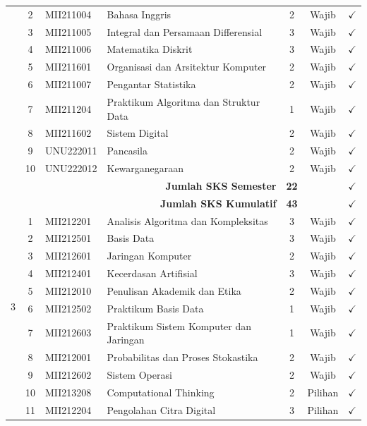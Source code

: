 \begin{longtable}{|c|c|l|p{5.5cm}|c|c|c|}
    & 2 & MII211004 & Bahasa Inggris & 2 & Wajib & $\checkmark$ \\
    & 3 & MII211005 & Integral dan Persamaan Differensial & 3 & Wajib & $\checkmark$ \\
    & 4 & MII211006 & Matematika Diskrit & 3 & Wajib & $\checkmark$ \\
    & 5 & MII211601 & Organisasi dan Arsitektur Komputer & 2 & Wajib & $\checkmark$ \\
    & 6 & MII211007 & Pengantar Statistika & 2 & Wajib & $\checkmark$ \\
    & 7 & MII211204 & Praktikum Algoritma dan Struktur Data & 1 & Wajib & $\checkmark$ \\
    & 8 & MII211602 & Sistem Digital & 2 & Wajib & $\checkmark$ \\
    & 9 & UNU222011 & Pancasila & 2 & Wajib & $\checkmark$ \\
    & 10 & UNU222012 & Kewarganegaraan & 2 & Wajib & $\checkmark$ \\
    \hline
    \multicolumn{4}{|r|}{\textbf{Jumlah SKS Semester}} & \textbf{22} & & $\checkmark$ \\
    \multicolumn{4}{|r|}{\textbf{Jumlah SKS Kumulatif}} & \textbf{43} & & $\checkmark$ \\
    \hline
    \multirow{10}{*}{3}
    & 1 & MII212201 & Analisis Algoritma dan Kompleksitas & 3 & Wajib & $\checkmark$ \\
    & 2 & MII212501 & Basis Data & 3 & Wajib & $\checkmark$ \\
    & 3 & MII212601 & Jaringan Komputer & 2 & Wajib & $\checkmark$ \\
    & 4 & MII212401 & Kecerdasan Artifisial & 3 & Wajib & $\checkmark$ \\
    & 5 & MII212010 & Penulisan Akademik dan Etika & 2 & Wajib & $\checkmark$ \\
    & 6 & MII212502 & Praktikum Basis Data & 1 & Wajib & $\checkmark$ \\
    & 7 & MII212603 & Praktikum Sistem Komputer dan Jaringan & 1 & Wajib & $\checkmark$ \\
    & 8 & MII212001 & Probabilitas dan Proses Stokastika & 2 & Wajib & $\checkmark$ \\
    & 9 & MII212602 & Sistem Operasi & 2 & Wajib & $\checkmark$ \\
    & 10 & MII213208 & Computational Thinking & 2 & Pilihan & $\checkmark$ \\
    & 11 & MII212204 & Pengolahan Citra Digital & 3 & Pilihan & $\checkmark$ \\

\end{longtable}
